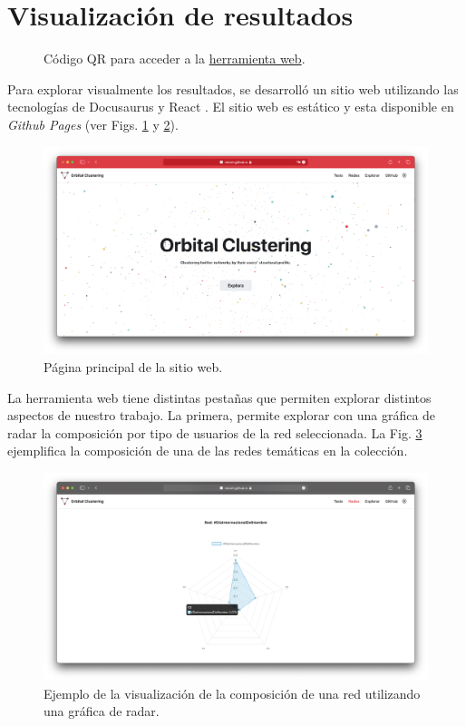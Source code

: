 \section{Visualización de resultados}
 \begin{figure}[htbp]
   \centering
   
    \caption{Código QR para acceder a la \href{https://roicort.github.io/OrbitalClustering}{herramienta web}.}
    \label{img:web-qr}
\end{figure}

Para explorar visualmente los resultados, se desarrolló un sitio web utilizando las tecnologías de Docusaurus \cite{meta_docusaurus_2022} y React \cite{meta_react_2013}. El sitio web es estático y esta disponible en \textit{Github Pages} (ver Figs. \ref{img:web-qr} y \ref{img:web-main}). 

 \begin{figure}
   \centering
   \includegraphics[width=1\textwidth]{images/web-main.png}
    \caption{Página principal de la sitio web.}
    \label{img:web-main}
\end{figure}

La herramienta web tiene distintas pestañas que permiten explorar distintos aspectos de nuestro trabajo. La primera, permite explorar con una gráfica de radar la composición por tipo de usuarios de la red seleccionada. La Fig. \ref{img:web-comp} ejemplifica la composición de una de las redes temáticas en la colección.

 \begin{figure}
   \centering
   \includegraphics[width=1\textwidth]{images/web-comp.png}
    \caption{Ejemplo de la visualización de la composición de una red utilizando una gráfica de radar.}
    \label{img:web-comp}
\end{figure}

